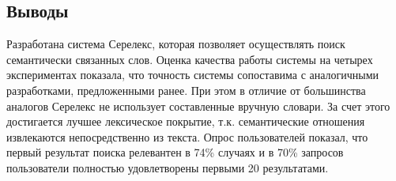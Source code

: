 \documentclass[a4paper,10pt,twoside]{article}
\begin{document}
\subsection{Выводы}

Разработана система Серелекс, которая позволяет осуществлять поиск семантически связанных слов. Оценка качества работы системы на четырех экспериментах показала, что точность системы сопоставима с аналогичными разработками, предложенными ранее. При этом в отличие от большинства аналогов Серелекс не использует составленные вручную словари. За счет этого достигается лучшее лексическое покрытие, т.к. семантические отношения извлекаются непосредственно из текста. Опрос пользователей показал, что первый результат поиска релевантен в 74\% случаях и в 70\% запросов пользователи полностью удовлетворены первыми 20 результатами.   



\end{document}
